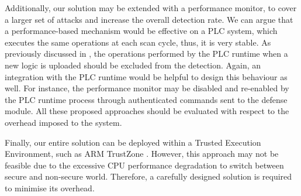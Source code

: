 Additionally, our solution may be extended with a performance monitor, to cover a larger set of attacks and increase the overall detection rate.
We can argue that a performance-based mechanism would be effective on a PLC system, which executes the same operations at each scan cycle, thus, it is very stable.
As previously discussed in , the operations performed by the PLC runtime when a new logic is uploaded should be excluded from the detection.
Again, an integration with the PLC runtime would be helpful to design this behaviour as well.
For instance, the performance monitor may be disabled and re-enabled by the PLC runtime process through authenticated commands sent to the defense module.
All these proposed approaches should be evaluated with respect to the overhead imposed to the system.

Finally, our entire solution can be deployed within a Trusted Execution Environment, such as ARM TrustZone \cite{trustzone}.
However, this approach may not be feasible due to the excessive CPU performance degradation to switch between secure and non-secure world.
Therefore, a carefully designed solution is required to minimise its overhead.
